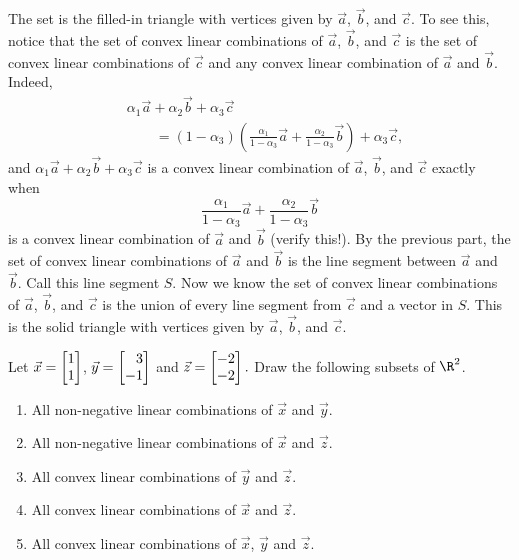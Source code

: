 \begin{exercises}
\begin{problist}
\begin{solution}
\begin{enumerate}
			The set is the filled-in
			triangle with vertices given by $\vec a$,
			$\vec b$, and $\vec c$. To see this, notice
			that the set of convex linear combinations of
			$\vec a$, $\vec b$, and $\vec c$ is the set of
			convex linear combinations of $\vec c$ and any
			convex linear combination of $\vec a$ and
			$\vec b$. Indeed,
			\[
			\begin{split}
				&\alpha_{1} \vec a+\alpha_{2} \vec b+ \alpha_{3}
				\vec c \\
				&\qquad= (1-\alpha_{3})\left(\tfrac{\alpha_1}{1-\alpha_3}\vec
				a + \tfrac{\alpha_2}{1-\alpha_3}\vec b\right)+\alpha_{3}
				\vec c,
			\end{split}
			\]
			and $\alpha_{1} \vec a+\alpha_{2} \vec b+ \alpha_{3}
			\vec c$ is a convex linear combination of $\vec
			a$, $\vec b$, and $\vec c$ exactly when
			\[
				\frac{\alpha_1}{1-\alpha_3}\vec a + \frac{\alpha_2}{1-\alpha_3}\vec b
			\]
			 is a convex linear combination of $\vec a$ and $\vec
			b$ (verify this!).
				By the previous part, the set of convex linear combinations
			of $\vec a$ and $\vec b$ is the line segment
			between $\vec a$ and $\vec b$. Call this line segment $S$.
			Now we know the set of convex linear
			combinations of $\vec a$, $\vec b$, and $\vec c$
			is the union of every line segment from $\vec c$
			and a vector in $S$. This is the solid triangle with
			vertices given by $\vec a$, $\vec b$, and $\vec	c$.
		\end{enumerate}
	\end{solution}

	\prob
		Let $\vec x=\mat{1 \\ 1}$, $\vec y = \mat{3 \\ -1}$ and $\vec z=\mat{-2 \\ -2}.$  Draw the following subsets of $\R^2$.
		\begin{enumerate}
		\item All non-negative linear combinations of $\vec x$ and $\vec y$.
		\item All non-negative linear combinations of $\vec x$ and $\vec z$.
		\item\label{PROBcconvex} All convex linear combinations of $\vec y$ and $\vec z$.
		\item\label{PROBdconvex} All convex linear combinations of $\vec x$ and $\vec z$.
		\item All convex linear combinations of $\vec x$, $\vec y$ and $\vec z$.


\end{enumerate}
\end{problist}
\end{exercises}
